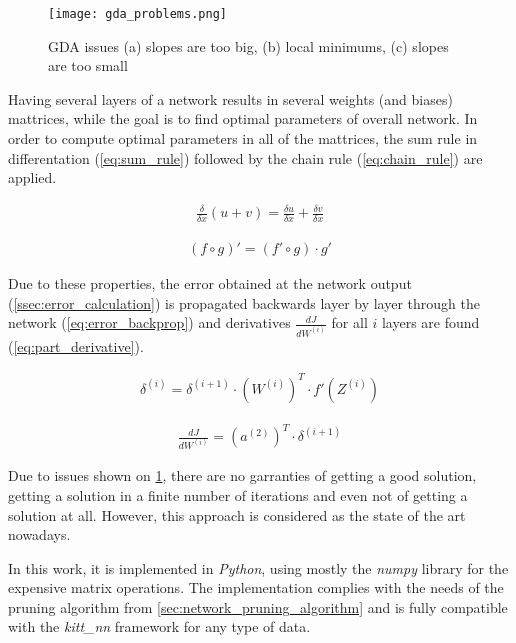 \begin{figure}[H]
  \centering
  \texttt{[image: gda\_problems.png]}
  \caption{GDA issues \citep{online:nn_demystified} (a) slopes are too big, (b) local minimums, (c) slopes are too small}
  \label{img:gda_problems}
\end{figure}


Having several layers of a network results in several weights (and biases) mattrices, while the goal is to find optimal parameters of overall network. In order to compute optimal parameters in all of the mattrices, the sum rule in differentation (\cref{eq:sum_rule}) followed by the chain rule (\cref{eq:chain_rule}) are applied.

\begin{align} \label{eq:sum_rule}
\frac{\delta}{\delta x} (u+v) = \frac{\delta u}{\delta x} + \frac{\delta v}{\delta x}
\end{align}

\begin{align} \label{eq:chain_rule}
(f \circ g)' = (f' \circ g) \cdot g'
\end{align}

Due to these properties, the error obtained at the network output (\cref{ssec:error_calculation}) is propagated backwards layer by layer through the network (\cref{eq:error_backprop}) and derivatives $ \frac{dJ}{dW^{(i)}} $ for all $ i $ layers are found (\cref{eq:part_derivative}).

\begin{align} \label{eq:error_backprop}
\delta^{(i)} = \delta^{(i+1)} \cdot (W^{(i)})^T \cdot f'(Z^{(i)})
\end{align}

\begin{align} \label{eq:part_derivative}
\frac{dJ}{dW^{(i)}} = (a^{(2)})^T \cdot \delta^{(i+1)}
\end{align}

Due to issues shown on \cref{img:gda_problems}, there are no garranties of getting a good solution, getting a solution in a finite number of iterations and even not of getting a solution at all. However, this approach is considered as the state of the art nowadays.

In this work, it is implemented in \textit{Python}, using mostly the \textit{numpy} library for the expensive matrix operations. The implementation complies with the needs of the pruning algorithm from \cref{sec:network_pruning_algorithm} and is fully compatible with the \textit{kitt\_nn} framework for any type of data.

